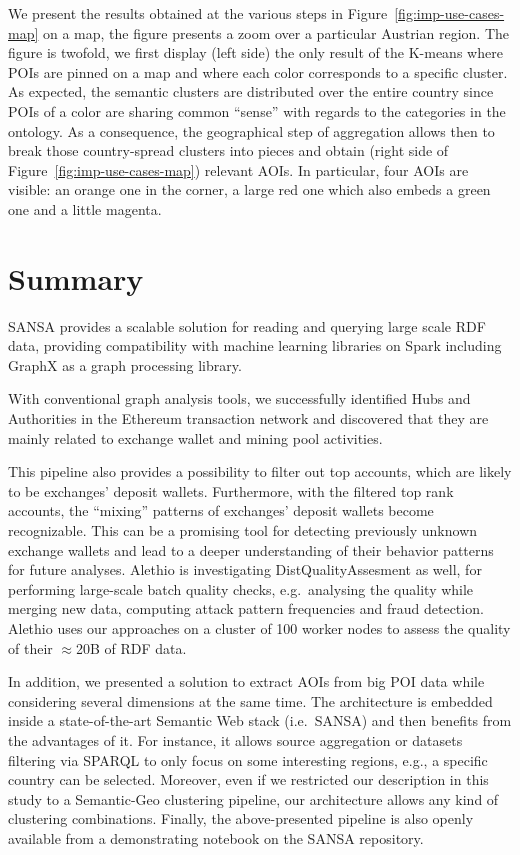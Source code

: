 We present the results obtained at the various steps in Figure~\ref{fig:imp-use-cases-map} on a map, the figure presents a zoom over a particular Austrian region. The figure is twofold, we first display (left side) the only result of the K-means where \gls{POI}s are pinned on a map and where each color corresponds to a specific cluster. As expected, the semantic clusters are distributed over the entire country since \gls{POI}s of a color are sharing common ``sense'' with regards to the categories in the ontology. As a consequence, the geographical step of aggregation allows then to break those country-spread clusters into pieces and obtain (right side of Figure~\ref{fig:imp-use-cases-map}) relevant \gls{AOI}s. In particular, four \gls{AOI}s are visible: an orange one in the corner, a large red one which also embeds a green one and a little magenta.


\section{Summary}
SANSA provides a scalable solution for reading and querying large scale \gls{RDF} data, providing compatibility with machine learning libraries on Spark including GraphX as a graph processing library.

With conventional graph analysis tools, we successfully identified Hubs and Authorities in the Ethereum transaction network and discovered that they are mainly related to exchange wallet and mining pool activities.

This pipeline also provides a possibility to filter out top accounts, which are likely to be exchanges' deposit wallets. 
Furthermore, with the filtered top rank accounts, the ``mixing'' patterns of exchanges' deposit wallets become recognizable. 
This can be a promising tool for detecting previously unknown exchange wallets and lead to a deeper understanding of their behavior patterns for future analyses.
Alethio is investigating DistQualityAssesment as well, for performing large-scale batch quality checks, e.g.~analysing the quality while merging new data, computing attack pattern frequencies and fraud detection. 
Alethio uses our approaches on a cluster of 100 worker nodes to assess the quality of their $\approx$20B of RDF data.

In addition, we presented a solution to extract \gls{AOI}s from big POI data while considering several dimensions at the same time. The architecture is embedded inside a state-of-the-art Semantic Web stack (i.e.~SANSA) and then benefits from the advantages of it. For instance, it allows source aggregation or datasets filtering via \gls{SPARQL} to only focus on some interesting regions, e.g., a specific country can be selected. 
Moreover, even if we restricted our description in this study to a Semantic-Geo clustering pipeline, our architecture allows any kind of clustering combinations.
Finally, the above-presented pipeline is also openly available from a demonstrating notebook on the SANSA repository.
